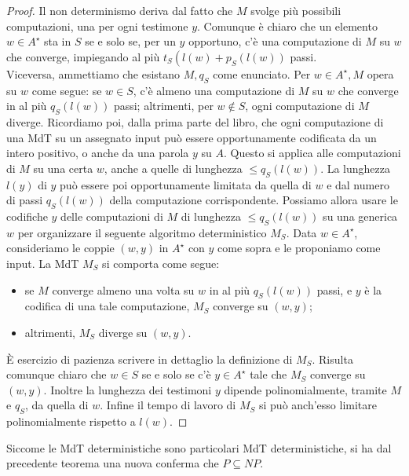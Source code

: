 \begin{proof}
    Il non determinismo deriva dal fatto che $M$ svolge più possibili
    computazioni, una per ogni testimone $y$. Comunque è chiaro che un elemento
    $w \in A^{\star}$ sta in $S$
    se e solo se, per un $y$ opportuno, c'è una computazione di $M$ su $w$ che
    converge, impiegando al più $t_S\left(l(w)+p_S(l(w))\right.$ passi.\\
    Viceversa, ammettiamo che esistano $M, q_S$ come enunciato. Per $w \in
        A^{\star}, M$ opera su $w$ come segue: se $w \in S$, c'è almeno una
    computazione di $M$ su $w$ che converge in al più $q_S(l(w))$ passi;
    altrimenti, per $w \notin S$, ogni computazione di $M$ diverge. Ricordiamo
    poi, dalla prima parte del libro, che ogni computazione di una MdT su un
    assegnato input può essere opportunamente codificata da un intero positivo,
    o anche da una parola $y$ su $A$. Questo si applica alle computazioni di $M$
    su una certa $w$, anche a quelle di lunghezza $\leq q_S(l(w))$. La lunghezza
    $l(y)$ di $y$ può essere poi opportunamente limitata da quella di $w$ e dal
    numero di passi $q_S(l(w))$ della computazione corrispondente. Possiamo
    allora usare le codifiche $y$ delle computazioni di $M$ di lunghezza $\leq
        q_S(l(w))$ su una generica $w$ per organizzare il seguente algoritmo
    deterministico $M_S$. Data $w \in A^{\star}$, consideriamo le coppie $(w,
        y)$ in $A^{\star}$ con $y$ come sopra e le proponiamo come input. La MdT
    $M_S$ si comporta come segue:
    \begin{itemize}
        \item se $M$ converge almeno una volta su $w$ in al più $q_S(l(w))$
              passi, e $y$ è la codifica di una tale computazione, $M_S$ converge su
              $(w, y)$;
        \item altrimenti, $M_S$ diverge su $(w, y)$.
    \end{itemize}
    È esercizio di pazienza scrivere in dettaglio la definizione di $M_S$.
    Risulta comunque chiaro che $w \in S$ se e solo se c'è $y \in A^{\star}$
    tale che $M_S$ converge su $(w, y)$. Inoltre la lunghezza dei testimoni $y$
    dipende polinomialmente, tramite $M$ e $q_S$, da quella di $w$. Infine il
    tempo di lavoro di $M_S$ si può anch'esso limitare polinomialmente rispetto
    a $l(w)$.
\end{proof}

Siccome le MdT deterministiche sono particolari MdT deterministiche, si ha dal
precedente teorema una nuova conferma che $P \subseteq N P$.